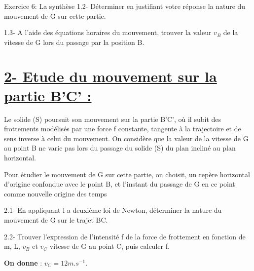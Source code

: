 \documentclass[12pt, french]{article}
\begin{document}
\begin{Box2}{Exercice 6: La synthèse }
1.2- Déterminer en justifiant votre réponse la nature du mouvement de G sur cette partie.

1.3- A l’aide des équations horaires du mouvement, trouver la valeur $v_B$ de la vitesse de G lors du
passage par la position B.

\section*{\underline{2- Etude du mouvement sur la partie B’C’ :}}

Le solide (S) poursuit son mouvement sur la partie B’C’, où il subit des frottements modélisés par une
force f constante, tangente à la trajectoire et de sens inverse à celui du mouvement.
On considère que la valeur de la vitesse de G au point B ne varie pas lors du passage du solide (S) du plan
incliné au plan horizontal.

Pour étudier le mouvement de G sur cette partie, on choisit, un repère horizontal
d’origine confondue avec le point B, et l’instant du passage de G en ce point comme nouvelle origine des
temps

2.1- En appliquant l a deuxième loi de Newton, déterminer la nature du mouvement de G sur le trajet BC.

2.2- Trouver l’expression de l’intensité f de la force de frottement en fonction de m, L, $v_B$ et $v_C$ vitesse
de G au point C, puis calculer f.

\textbf{On donne} : $v_C = 12 m.s^{-1}$.

\end{Box2}
\end{document}
